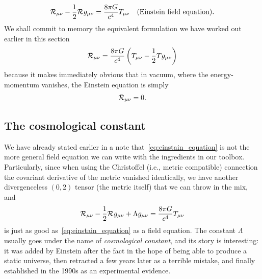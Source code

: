 \begin{align}\label{eq:einstain_equation}
  \mathcal{R}_{\mu\nu} - \frac{1}{2}\mathcal{R}_{}g_{\mu\nu} = \frac{8\pi G}{c^4} T_{\mu\nu}
  \quad\text{(Einstein field equation)}.
\end{align}
We shall commit to memory the equivalent formulation we have worked out earlier
in this section
\begin{align}\label{eq:einstain_equation_alt}
  \mathcal{R}_{\mu\nu} = \frac{8\pi G}{c^4} \left( T_{\mu\nu} -\frac{1}{2} T g_{\mu\nu} \right)
\end{align}
because it makes immediately obvious that in vacuum, where the energy-momentum
vanishes, the Einstein equation is simply
\begin{align}
  \mathcal{R}_{\mu\nu} = 0.
\end{align}


\subsection{The cosmological constant}

We have already stated earlier in a note that~\eqref{eq:einstain_equation} is not
the more general field equation we can write with the ingredients in our toolbox.
Particularly, since when using the Christoffel (i.e., metric compatible) connection
the covariant derivative of the metric vanished identically, we have another
divergenceless $(0, 2)$ tensor (the metric itself) that we can throw in the mix, and
\begin{align}
  \mathcal{R}_{\mu\nu} - \frac{1}{2} \mathcal{R}_{} g_{\mu\nu} + \Lambda g_{\mu\nu} =
  \frac{8\pi G}{c^4} T_{\mu\nu}
\end{align}
is just as good as~\eqref{eq:einstain_equation} as a field equation. The constant $\Lambda$ usually goes under the name of  \emph{cosmological constant},
and its story is interesting: it was added by Einstein after the fact in the hope
of being able to produce a static universe, then retracted a few years later as a
terrible mistake, and finally established in the 1990s as an experimental evidence.


